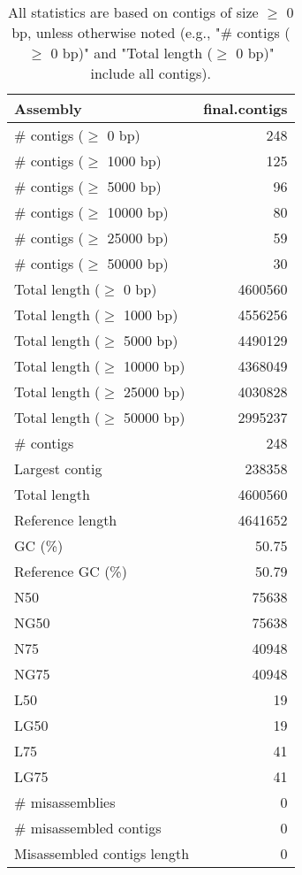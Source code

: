 \documentclass[12pt,a4paper]{article}
\begin{document}
\begin{table}[ht]
\begin{center}
\caption{All statistics are based on contigs of size $\geq$ 0 bp, unless otherwise noted (e.g., "\# contigs ($\geq$ 0 bp)" and "Total length ($\geq$ 0 bp)" include all contigs).}
\begin{tabular}{|l*{1}{|r}|}
\hline
Assembly & final.contigs \\ \hline
\# contigs ($\geq$ 0 bp) & 248 \\ \hline
\# contigs ($\geq$ 1000 bp) & 125 \\ \hline
\# contigs ($\geq$ 5000 bp) & 96 \\ \hline
\# contigs ($\geq$ 10000 bp) & 80 \\ \hline
\# contigs ($\geq$ 25000 bp) & 59 \\ \hline
\# contigs ($\geq$ 50000 bp) & 30 \\ \hline
Total length ($\geq$ 0 bp) & 4600560 \\ \hline
Total length ($\geq$ 1000 bp) & 4556256 \\ \hline
Total length ($\geq$ 5000 bp) & 4490129 \\ \hline
Total length ($\geq$ 10000 bp) & 4368049 \\ \hline
Total length ($\geq$ 25000 bp) & 4030828 \\ \hline
Total length ($\geq$ 50000 bp) & 2995237 \\ \hline
\# contigs & 248 \\ \hline
Largest contig & 238358 \\ \hline
Total length & 4600560 \\ \hline
Reference length & 4641652 \\ \hline
GC (\%) & 50.75 \\ \hline
Reference GC (\%) & 50.79 \\ \hline
N50 & 75638 \\ \hline
NG50 & 75638 \\ \hline
N75 & 40948 \\ \hline
NG75 & 40948 \\ \hline
L50 & 19 \\ \hline
LG50 & 19 \\ \hline
L75 & 41 \\ \hline
LG75 & 41 \\ \hline
\# misassemblies & 0 \\ \hline
\# misassembled contigs & 0 \\ \hline
Misassembled contigs length & 0 \\ \hline

\end{tabular}
\end{center}
\end{table}
\end{document}
